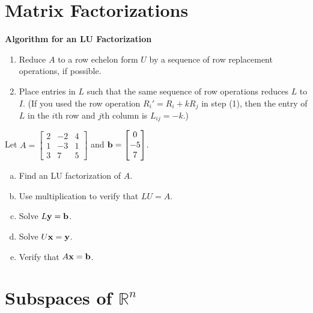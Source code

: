 \newpage

\setcounter{section}{4}


\section{Matrix Factorizations}
\name[1.5in]

\begin{boxthm}
	\textbf{Algorithm for an LU Factorization}
		\begin{enumerate}[(1)]
		\item Reduce $A$ to a row echelon form $U$ by a sequence of row replacement operations, if possible. 
		\item Place entries in $L$ such that the same sequence of row operations reduces $L$ to $I$. (If you used the row operation $R_i'=R_i+kR_j$ in step (1), then the entry of $L$ in the $i$th row and $j$th column is $L_{ij}=-k$.)
	\end{enumerate}
\end{boxthm}

\begin{exercise} %
	Let $A = \begin{bmatrix}2&-2&4\\1&-3&1\\3&7&5\end{bmatrix}$ and $\boldsymbol{\mathbf{b}} = \begin{bmatrix}0\\-5\\7\end{bmatrix}$.
	\begin{enumerate}[(a)]
		\item Find an LU factorization of $A$.
		\vfill
		\vfill
		\item Use multiplication to verify that $LU=A$.
		\vfill
		\newpage
		\item Solve $L\boldsymbol{\mathbf{y}}=\boldsymbol{\mathbf{b}}$. 
		\vfill
		\item Solve $U\boldsymbol{\mathbf{x}}=\boldsymbol{\mathbf{y}}$. 
		\vfill
		\item Verify that $A\boldsymbol{\mathbf{x}}=\boldsymbol{\mathbf{b}}$.
		\vspace{4cm}
	\end{enumerate}
\end{exercise}
	
\newpage

\setcounter{section}{7}


\section{Subspaces of $\mathbb{R}^n$}
\name[1.5in]

